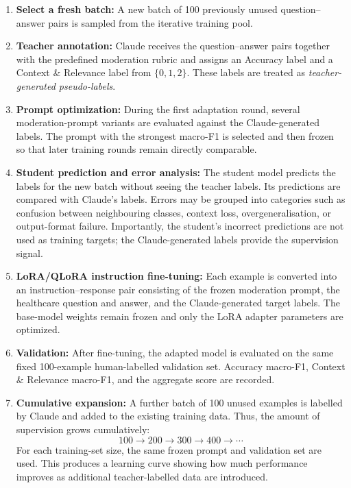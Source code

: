 \documentclass[11pt,a4paper]{article}
\begin{document}
\begin{enumerate}[nosep]
    \item \textbf{Select a fresh batch:}
    A new batch of 100 previously unused question--answer pairs is sampled from
    the iterative training pool.

    \item \textbf{Teacher annotation:}
    Claude receives the question--answer pairs together with the predefined
    moderation rubric and assigns an Accuracy label and a Context \& Relevance
    label from $\{0,1,2\}$. These labels are treated as
    \emph{teacher-generated pseudo-labels}.

    \item \textbf{Prompt optimization:}
    During the first adaptation round, several moderation-prompt variants are
    evaluated against the Claude-generated labels. The prompt with the strongest
    macro-F1 is selected and then frozen so that later training rounds remain
    directly comparable.

    \item \textbf{Student prediction and error analysis:}
    The student model predicts the labels for the new batch without seeing the
    teacher labels. Its predictions are compared with Claude's labels. Errors
    may be grouped into categories such as confusion between neighbouring
    classes, context loss, overgeneralisation, or output-format failure.
    Importantly, the student's incorrect predictions are not used as training
    targets; the Claude-generated labels provide the supervision signal.

    \item \textbf{LoRA/QLoRA instruction fine-tuning:}
    Each example is converted into an instruction--response pair consisting of
    the frozen moderation prompt, the healthcare question and answer, and the
    Claude-generated target labels. The base-model weights remain frozen and
    only the LoRA adapter parameters are optimized.

    \item \textbf{Validation:}
    After fine-tuning, the adapted model is evaluated on the same fixed
    100-example human-labelled validation set. Accuracy macro-F1, Context \&
    Relevance macro-F1, and the aggregate score are recorded.

    \item \textbf{Cumulative expansion:}
    A further batch of 100 unused examples is labelled by Claude and added to
    the existing training data. Thus, the amount of supervision grows
    cumulatively:
    \[
        100 \rightarrow 200 \rightarrow 300 \rightarrow 400
        \rightarrow \cdots
    \]
    For each training-set size, the same frozen prompt and validation set are
    used. This produces a learning curve showing how much performance improves
    as additional teacher-labelled data are introduced.


\end{enumerate}
\end{document}
